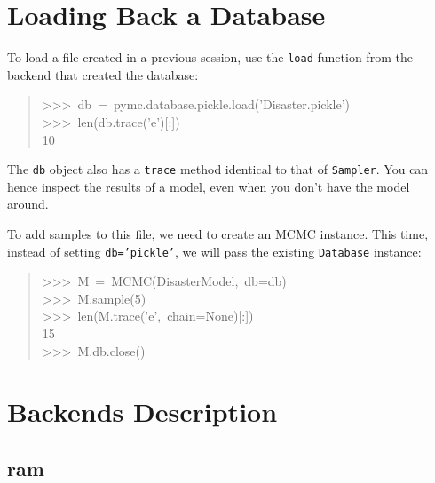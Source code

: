 
\hypertarget{loading-back-a-database}{}
\section*{Loading Back a Database}

To load a file created in a previous session, use the \texttt{load} function
from the backend that created the database:
\begin{quote}{\ttfamily \raggedright \noindent
>{}>{}>~db~=~pymc.database.pickle.load('Disaster.pickle')~\\
>{}>{}>~len(db.trace('e'){[}:])~\\
10
}\end{quote}

The \texttt{db} object also has a \texttt{trace} method identical to that of \texttt{Sampler}. 
You can hence inspect the results of a model, even when you don't have the model
around.

To add samples to this file, we need to create an MCMC instance. This time, 
instead of setting \texttt{db='pickle'}, we will pass the existing \texttt{Database} 
instance:
\begin{quote}{\ttfamily \raggedright \noindent
>{}>{}>~M~=~MCMC(DisasterModel,~db=db)~\\
>{}>{}>~M.sample(5)~\\
>{}>{}>~len(M.trace('e',~chain=None){[}:])~\\
15~\\
>{}>{}>~M.db.close()
}\end{quote}



\hypertarget{backends-description}{}
\section*{Backends Description}



\hypertarget{ram}{}
\subsection*{ram}

